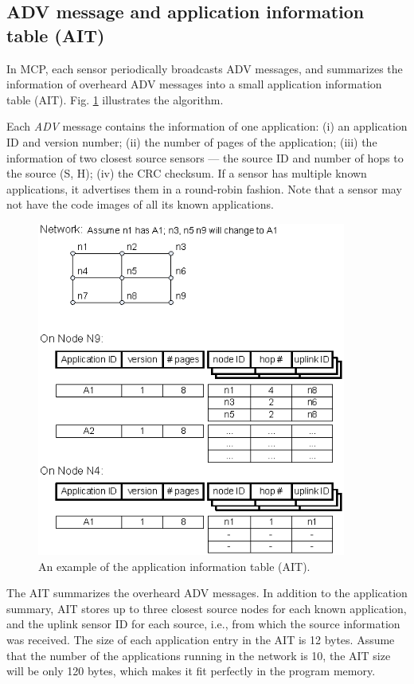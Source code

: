 \subsection{ADV message and application information table (AIT)}
In MCP, each sensor periodically broadcasts ADV messages, and summarizes the information of overheard ADV messages into 
a small application information table (AIT). Fig. \ref{fait} illustrates the algorithm.

Each {\it ADV} message contains the information of one application: (i) an application ID and version number; (ii) the 
number of pages of the application; (iii) the information of two closest source sensors --- the source ID and number of 
hops to the source (S, H); (iv) the CRC checksum. 
If a sensor has multiple known applications, it advertises them in a round-robin fashion. Note that a sensor may not 
have the code images of all its known applications. 

\begin{figure}[htbp]
\begin{center}
\includegraphics[width=4in]{figures/ftable.eps}
\caption{An example of the application information table (AIT).}
\label{fait}
\end{center}
\end{figure}




The AIT summarizes the overheard ADV messages. In addition to the application summary, AIT stores up to three closest 
source nodes for each known application, and the uplink sensor ID for each source, i.e., from which the source 
information was received.
The size of each application entry in the AIT is 12 bytes. Assume that the number of the applications running in the 
network is 10,
the AIT size will be only 120 bytes, which makes it fit perfectly in the program memory.

